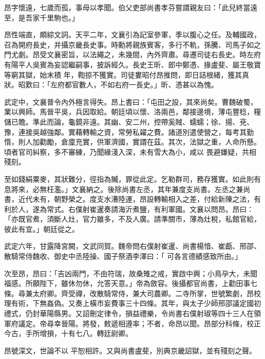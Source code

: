 \begin{pinyinscope}
 昂字懷遠，七歲而孤，事母以孝聞。伯父吏部尚書孝芬嘗謂親友曰：「此兒終當遠至，是吾家千里駒也。」



 昂性端直，頗綜文詞。天平二年，文襄引為記室參軍，季以腹心之任。及輔國政，召為開府長史，并攝京畿長史事。時勳將親族賓客，多行不軌，孫騰、司馬子如之門尤劇。昂受文襄密旨，以法繩之，未幾間，內外齊肅。尋遷司徒右長史。時左府有陽平人吳賓為妄認繼嗣事，披訴經久。長史王昕、郎中鄭憑、掾盧斐、屬王敬寶等窮其獄，始末積
 年，鞫掠不獲實。司徒婁昭付昂推問，即日詰根緒，獲其真狀。昭歎曰：「左府都官數人，不如右府一長史。」昕、憑甚以為愧。



 武定中，文襄普令內外極言得失。昂上書曰：「屯田之設，其來尚矣。曹魏破蜀，業以興師。馬晉平吳，兵因取給。朝廷頃以懷、洛兩邑，鄰接邊境，薄屯豐稔，糧儲已贍。準此而論，龜鏡非遠。其幽、安二州，控帶奚賊、蠕蠕；徐、揚、兗、豫，連接吳越強鄰。實藉轉輸之資，常勞私糴之費。諸道別遣使營之，每考其勤惰，則人加勸勵，倉廩充實，供軍濟國，實謂在茲。其次，法獄之重，人命所懸。頃者官司糾察，多不審練，乃聞緣淺入深，未有雪大為小，咸以
 畏避嫌疑，共相殘刻。



 至如錢絹粟麥，其狀難分，徑指為贓，罪從此定。乞勒群司，務存獲實。如此則有息將來，必無枉濫。」文襄納之。後除尚書左丞，其年兼度支尚書。左丞之兼尚書，近代未有，朝野榮之。度支水漕陸運，昂設轉輸相入之差，付給新陳之法，有利於人，遂為常式。右僕射崔暹奏請海沂煮鹽，有利軍國。文襄以問昂。昂曰：「亦既官煮，須斷人灶，官力雖多，不及人廣。請準關市，薄為灶稅，私館官給，彼此有宜。」朝廷從之。



 武定六年，甘露降宮闕，文武同賀。魏帝問右僕射崔暹、尚書楊愔、崔甗、邢邵、散騎常侍魏收、御史中丞陸操、國子祭酒李澤曰：「
 可各言德績感致所由。」



 次至昂，昂曰：「吉凶兩門，不由符瑞，故桑雉之戒，實啟中興；小鳥孕大，未聞福感。所願陛下，雖休勿休，允答天意。」帝為斂容。後攝都官尚書，上勸田事七條。尋兼太府卿。齊受禪，改散騎常侍，兼大司農卿。二寺所掌，世號繁劇，昂校理有術，下無姦偽。又奏上橫市妄費事三十四條。其年，與太子少師邢邵議定國初禮式，仍封華陽縣男。又詔刪定律令，損益禮樂，令尚書右僕射琡等四十三人在領軍府議定。帝尋幸晉陽。將發，敕遞相遵率；不者，命昂以聞。昂部分科條，校正今古，手所增損，十有七八。轉廷尉卿。



 昂號深文，世論不以
 平恕相許。又與尚書盧斐，別典京畿詔獄，並有殘刻之聲。




\end{pinyinscope}
